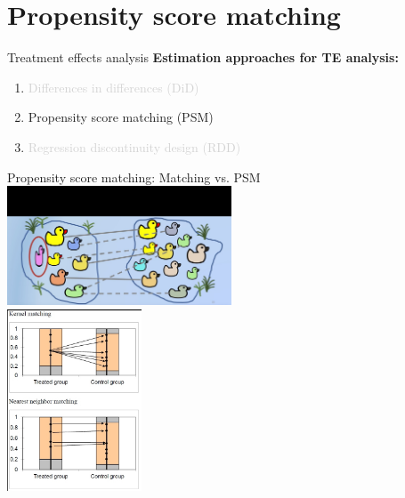 \documentclass{beamer}
\begin{document}
\section{Propensity score matching}
\begin{frame}{Treatment effects analysis}
\textbf{Estimation approaches for TE analysis:}\\
\bigskip
\begin{enumerate}
    \item \textcolor{lightgray}{Differences in differences (DiD)}
    \bigskip
    \item Propensity score matching (PSM)
    \bigskip
    \item \textcolor{lightgray}{Regression discontinuity design (RDD)}
\end{enumerate}
\end{frame}
\begin{frame}{Propensity score matching: Matching vs. PSM}
\centering
\includegraphics[trim = 0cm 0cm 0cm 6cm, clip, width=0.5\textwidth]{./IMG/PSM1.jpg}
\\
\medskip
\includegraphics[trim = 0.1cm 0.15cm 0cm 0.15cm, clip, width=0.3\textwidth]{./IMG/PSM2.jpg}
\end{frame}
\end{document}
